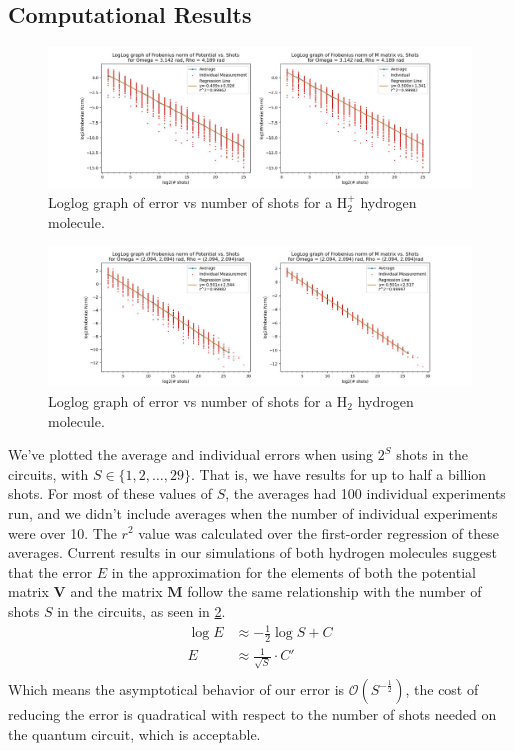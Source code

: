 \documentclass{aux/ttuthes2007}
\begin{document}
\subsection{\textbf{Computational Results}}
\begin{figure}[h!]
	\includegraphics[width=\linewidth]{img/1e.jpg}
	\caption{Loglog graph of error vs number of shots for a $\text{H}_2^+$ hydrogen molecule.}
  \label{fig:1derrorgraph}
\end{figure}

\begin{figure}[h!]
	\includegraphics[width=\linewidth]{img/2e-nonint.jpg}
  \caption{Loglog graph of error vs number of shots for a $\text{H}_2$ hydrogen molecule.}
  \label{fig:2derrorgraph}
\end{figure}

We've plotted the average and individual errors when using $2^S$ shots in the circuits, with $S \in \{1, 2, \ldots, 29\}$. That is, we have results for up to half a billion shots. For most of these values of $S$, the averages had 100 individual experiments run, and we didn't include averages when the number of individual experiments were over 10. The $r^2$ value was calculated over the first-order regression of these averages.
Current results in our simulations of both hydrogen molecules suggest that the error $E$ in the approximation for the elements of both the potential matrix $\bm V$ and the matrix $\bm M$ follow the same relationship with the number of shots $S$ in the circuits, as seen in \ref{fig:2derrorgraph}. 
%
\begin{equation*}
	\begin{split}
		\log E &\approx -\frac 1 2 \log S + C \\
		E &\approx \frac 1 {\sqrt{S}} \cdot C' \\
	\end{split}
\end{equation*}
%
Which means the asymptotical behavior of our error is $\mathcal O(S^{-\frac 1 2})$, the cost of reducing the error is quadratical with respect to the number of shots needed on the quantum circuit, which is acceptable.
%
\end{document}
